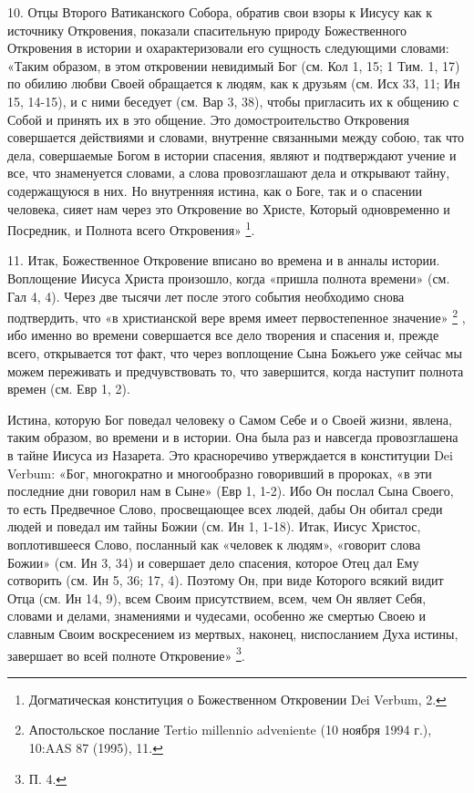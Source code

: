 \documentclass[a5paper,10pt]{article}
\begin{document}
10. Отцы Второго Ватиканского Собора, обратив свои взоры к Иисусу как к
источнику Откровения, показали спасительную природу Божественного Откровения в
истории и охарактеризовали его сущность следующими словами: «Таким образом, в
этом откровении невидимый Бог (см. Кол 1, 15; 1 Тим. 1, 17) по обилию любви
Своей обращается к людям, как к друзьям (см. Исх 33, 11; Ин 15, 14-15), и с
ними беседует (см. Вар 3, 38), чтобы пригласить их к общению с Собой и принять
их в это общение. Это домостроительство Откровения совершается действиями и
словами, внутренне связанными между собою, так что дела, совершаемые Богом в
истории спасения, являют и подтверждают учение и все, что знаменуется словами,
а слова провозглашают дела и открывают тайну, содержащуюся в них. Но внутренняя
истина, как о Боге, так и о спасении человека, сияет нам через это Откровение
во Христе, Который одновременно и Посредник, и Полнота всего Откровения»
\footnote{Догматическая конституция о Божественном Откровении Dei Verbum, 2.}.

11. Итак, Божественное Откровение вписано во времена и в анналы истории.
Воплощение Иисуса Христа произошло, когда «пришла полнота времени» (см. Гал 4,
4). Через две тысячи лет после этого события необходимо снова подтвердить, что
«в христианской вере время имеет первостепенное значение»
\footnote{Апостольское послание Tertio millennio adveniente (10 ноября 1994
г.), 10:AAS 87 (1995), 11.} , ибо именно во времени совершается все дело
творения и спасения и, прежде всего, открывается тот факт, что через воплощение
Сына Божьего уже сейчас мы можем переживать и предчувствовать то, что
завершится, когда наступит полнота времен (см. Евр 1, 2).

Истина, которую Бог поведал человеку о Самом Себе и о Своей жизни, явлена,
таким образом, во времени и в истории. Она была раз и навсегда провозглашена в
тайне Иисуса из Назарета. Это красноречиво утверждается в конституции Dei
Verbum: «Бог, многократно и многообразно говоривший в пророках, «в эти
последние дни говорил нам в Сыне» (Евр 1, 1-2). Ибо Он послал Сына Своего, то
есть Предвечное Слово, просвещающее всех людей, дабы Он обитал среди людей и
поведал им тайны Божии (см. Ин 1, 1-18). Итак, Иисус Христос, воплотившееся
Слово, посланный как «человек к людям», «говорит слова Божии» (см. Ин 3, 34) и
совершает дело спасения, которое Отец дал Ему сотворить (см. Ин 5, 36; 17, 4).
Поэтому Он, при виде Которого всякий видит Отца (см. Ин 14, 9), всем Своим
присутствием, всем, чем Он являет Себя, словами и делами, знамениями и
чудесами, особенно же смертью Своею и славным Своим воскресением из мертвых,
наконец, ниспосланием Духа истины, завершает во всей полноте Откровение»
\footnote{П. 4.}.
\end{document}
